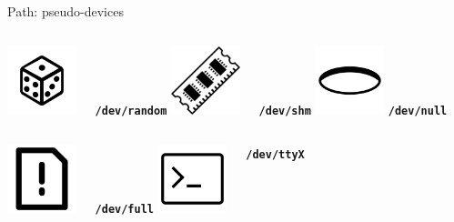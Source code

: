 \documentclass{beamer}
\begin{document}
    \begin{frame}{Path: pseudo-devices}
        \begin{columns}[t, onlytextwidth]
                \centering
                \includegraphics[height=2cm, keepaspectratio]{images/dice.pdf}
                
                \texttt{\textbf{/dev/random}}
                \centering
                \includegraphics[height=2cm, keepaspectratio]{images/ram.pdf}
                
                \texttt{\textbf{/dev/shm}}
                \centering
                \includegraphics[height=2cm, keepaspectratio]{images/hole.pdf}
                \texttt{\textbf{/dev/null}}
        \end{columns}

        \vspace{2cm}

        \begin{columns}[t, onlytextwidth]
                \centering
                \includegraphics[height=2cm, keepaspectratio]{images/alert-file.pdf}

                \texttt{\textbf{/dev/full}}
                \centering
                \includegraphics[height=2cm, keepaspectratio]{images/terminal.pdf}

                \texttt{\textbf{/dev/ttyX}}
        \end{columns}
        
    \end{frame}
\end{document}
